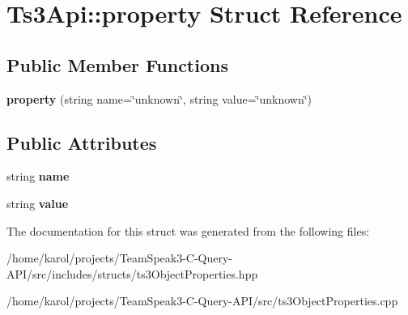 \hypertarget{struct_ts3_api_1_1property}{}\section{Ts3\+Api\+:\+:property Struct Reference}
\label{struct_ts3_api_1_1property}
\subsection*{Public Member Functions}
\begin{DoxyCompactItemize}
\item 
{\bfseries property} (string name=\char`\"{}unknown\char`\"{}, string value=\char`\"{}unknown\char`\"{})\hypertarget{struct_ts3_api_1_1property_a00b64cf56643cd8e684c7f7d6adb1383}{}\label{struct_ts3_api_1_1property_a00b64cf56643cd8e684c7f7d6adb1383}

\end{DoxyCompactItemize}
\subsection*{Public Attributes}
\begin{DoxyCompactItemize}
\item 
string {\bfseries name}\hypertarget{struct_ts3_api_1_1property_a1264609664cf7b97301c7b5afa57db1b}{}\label{struct_ts3_api_1_1property_a1264609664cf7b97301c7b5afa57db1b}

\item 
string {\bfseries value}\hypertarget{struct_ts3_api_1_1property_ac0864899755720986c7113aa2e35ea7f}{}\label{struct_ts3_api_1_1property_ac0864899755720986c7113aa2e35ea7f}

\end{DoxyCompactItemize}


The documentation for this struct was generated from the following files\+:\begin{DoxyCompactItemize}
\item 
/home/karol/projects/\+Team\+Speak3-\/\+C-\/\+Query-\/\+A\+P\+I/src/includes/structs/ts3\+Object\+Properties.\+hpp\item 
/home/karol/projects/\+Team\+Speak3-\/\+C-\/\+Query-\/\+A\+P\+I/src/ts3\+Object\+Properties.\+cpp\end{DoxyCompactItemize}

